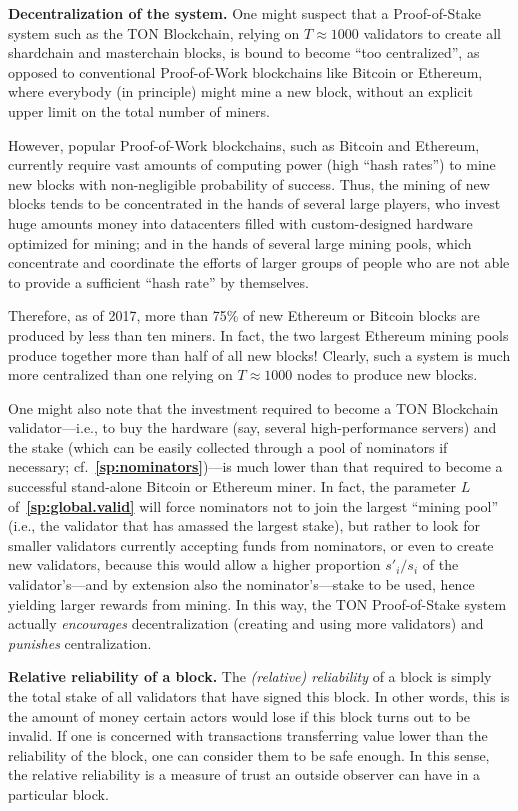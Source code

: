 \documentclass[12pt,oneside]{article}
\def\makepoint#1{\medbreak\noindent{\bf #1.\ }}
\def\nxsubpoint{\refstepcounter{subsubsection}%
  \smallbreak\makepoint{\thesubsubsection}}
\def\refpoint#1{{\rm\textbf{\ref{#1}}}}
\let\ptref=\refpoint
\def\embt(#1.){\textbf{#1.}}
\begin{document}
\nxsubpoint \embt(Decentralization of the system.)  One might suspect
that a Proof-of-Stake system such as the TON Blockchain, relying on
$T\approx1000$ validators to create all shardchain and masterchain
blocks, is bound to become ``too centralized'', as opposed to
conventional Proof-of-Work blockchains like Bitcoin or Ethereum, where
everybody (in principle) might mine a new block, without an explicit
upper limit on the total number of miners.

However, popular Proof-of-Work blockchains, such as Bitcoin and
Ether\-eum, currently require vast amounts of computing power (high
``hash rates'') to mine new blocks with non-negligible probability of
success. Thus, the mining of new blocks tends to be concentrated in the
hands of several large players, who invest huge amounts money into
datacenters filled with custom-designed hardware optimized for mining;
and in the hands of several large mining pools, which concentrate and
coordinate the efforts of larger groups of people who are not able to
provide a sufficient ``hash rate'' by themselves.

Therefore, as of 2017, more than 75\% of new Ethereum or Bitcoin
blocks are produced by less than ten miners. In fact, the two largest
Ethereum mining pools produce together more than half of all new
blocks! Clearly, such a system is much more centralized than one
relying on $T\approx1000$ nodes to produce new blocks.

One might also note that the investment required to become a TON
Blockchain validator---i.e., to buy the hardware (say, several
high-performance servers) and the stake (which can be easily collected
through a pool of nominators if necessary;
cf.~\ptref{sp:nominators})---is much lower than that required to
become a successful stand-alone Bitcoin or Ethereum miner. In fact,
the parameter $L$ of~\ptref{sp:global.valid} will force nominators not
to join the largest ``mining pool'' (i.e., the validator that has
amassed the largest stake), but rather to look for smaller validators
currently accepting funds from nominators, or even to create new
validators, because this would allow a higher proportion $s'_i/s_i$ of
the validator's---and by extension also the nominator's---stake to be
used, hence yielding larger rewards from mining. In this way, the TON
Proof-of-Stake system actually {\em encourages\/} decentralization
(creating and using more validators) and {\em punishes\/}
centralization.

\nxsubpoint\label{sp:rel.rel} \embt(Relative reliability of a block.)
The {\em (relative) reliability\/} of a block is simply the total
stake of all validators that have signed this block. In other words,
this is the amount of money certain actors would lose if this block
turns out to be invalid. If one is concerned with transactions
transferring value lower than the reliability of the block, one can
consider them to be safe enough. In this sense, the relative
reliability is a measure of trust an outside observer can have in a
particular block.
\end{document}
